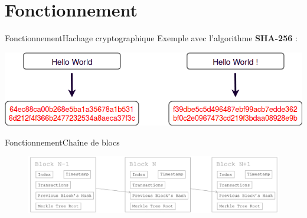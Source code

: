 \documentclass[xcolor=dvipsnames]{beamer}
\begin{document}
\section{Fonctionnement}

\begin{frame}{Fonctionnement}{Hachage cryptographique}
	Exemple avec l'algorithme \textbf{SHA-256} :
	\vspace{1cm}
	\begin{center}
		\includegraphics[scale=0.4]{hash.png} 
	\end{center}
\end{frame}

\begin{frame}{Fonctionnement}{Chaîne de blocs}
	\begin{center}
		\begin{figure}
			\includegraphics[scale=0.28]{blockk.png} 
		\end{figure}
	\end{center}
\end{frame}
\end{document}
